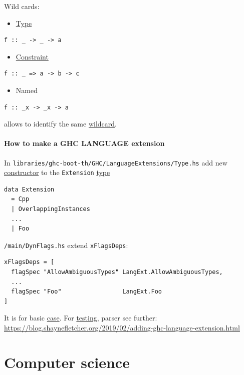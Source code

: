 \documentclass[a4paper,14pt,oneside]{book}
\begin{document}
Wild cards:
\begin{itemize}
\item \hyperref[orgaa4a18b]{Type}
\end{itemize}
\begin{verbatim}
f :: _ -> _ -> a
\end{verbatim}

\begin{itemize}
\item \hyperref[org38bf08b]{Constraint}
\end{itemize}
\begin{verbatim}
f :: _ => a -> b -> c
\end{verbatim}

\begin{itemize}
\item Named
\end{itemize}
\begin{verbatim}
f :: _x -> _x -> a
\end{verbatim}
allows to identify the same \hyperref[org8e3c0ce]{wildcard}.

\subsubsection{How to make a GHC LANGUAGE extension}
\label{sec:orgc58e923}

In \texttt{libraries/ghc-boot-th/GHC/LanguageExtensions/Type.hs} add new \hyperref[org3924086]{constructor} to the \texttt{Extension} \hyperref[orgaa4a18b]{type}
\begin{verbatim}
data Extension
  = Cpp
  | OverlappingInstances
  ...
  | Foo
\end{verbatim}

\texttt{/main/DynFlags.hs} extend \texttt{xFlagsDeps}:
\begin{verbatim}
xFlagsDeps = [
  flagSpec "AllowAmbiguousTypes" LangExt.AllowAmbiguousTypes,
  ...
  flagSpec "Foo"                 LangExt.Foo
]
\end{verbatim}
It is for basic \hyperref[org59b4767]{case}. For \hyperref[org27b4eb9]{testing}, parser see further: \url{https://blog.shaynefletcher.org/2019/02/adding-ghc-language-extension.html}

\chapter{Computer science}
\label{sec:orgfc9e866}
\end{document}
